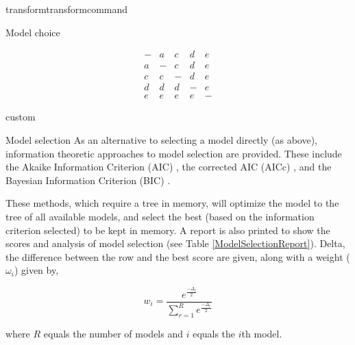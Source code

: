 \begin{command}{transform}{transformcommand}
\begin{arguments}
\begin {argumentgroup} {Model choice}
{                \begin{equation*}
                    \begin{array}{ccccc}
                        - & a & c & d & e \\
                        a & - & c & d & e \\
                        c & c & - & d & e \\
                        d & d & d & - & e \\
                        e & e & e & e & -
                     \end{array}
                \end{equation*}

              
                }
                {custom}

        \end{argumentgroup}
 
 
        \begin {argumentgroup}{Model selection}        
            As an alternative to selecting a model directly (as above), information 
            theoretic approaches to model selection are provided.
            These include the Akaike Information Criterion (AIC)
            \cite{akaike1973}, the corrected AIC (AICc)
            \cite{sugiura1978}, and the Bayesian Information Criterion (BIC)
            \cite{schwarz1978}.
            
            These methods, which require a tree in memory, will optimize the model
            to the tree of all available models, and select the best (based
            on the information criterion selected) to be kept in memory. A
            report is also printed to show the scores and analysis of model
            selection (see Table \ref {ModelSelectionReport}).  Delta, the 
            difference between the row and the best score are given, along
            with a weight (${\omega_i}$) given by,

            \begin{equation*}
                w_{i} = \frac{e^{\frac{-\Delta_i}{2}}}
                             {\sum^R_{r=1} e^{\frac{-\Delta_r}{2}}}
            \end{equation*}
            
            where $R$ equals the number of models and  $i$ equals the $i$th model. 
            

\end{argumentgroup}
\end{arguments}
\end{command}
